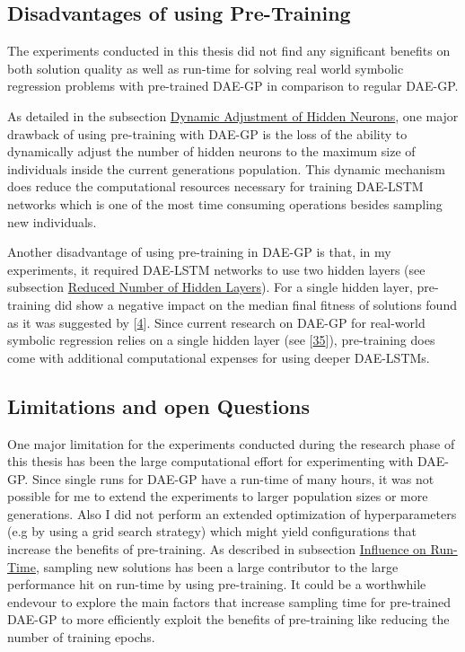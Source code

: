 \documentclass[
  11pt,
]{article}
\begin{document}
\hypertarget{disadvantages-of-using-pre-training}{%
\subsection{Disadvantages of using Pre-Training}\label{disadvantages-of-using-pre-training}}

The experiments conducted in this thesis did not find any significant benefits on both solution quality as well as run-time for solving real world symbolic regression problems with pre-trained DAE-GP in comparison to regular DAE-GP.

As detailed in the subsection \protect\hyperlink{dynamic-adjustment-of-hidden-neurons}{Dynamic Adjustment of Hidden Neurons}, one major drawback of using pre-training with DAE-GP is the loss of the ability to dynamically adjust the number of hidden neurons to the maximum size of individuals inside the current generations population.
This dynamic mechanism does reduce the computational resources necessary for training DAE-LSTM networks which is one of the most time consuming operations besides sampling new individuals.

Another disadvantage of using pre-training in DAE-GP is that, in my experiments, it required DAE-LSTM networks to use two hidden layers (see subsection \protect\hyperlink{reduced-number-of-hidden-layers}{Reduced Number of Hidden Layers}).
For a single hidden layer, pre-training did show a negative impact on the median final fitness of solutions found as it was suggested by {[}\protect\hyperlink{ref-pmlr-v9-erhan10a}{4}{]}.
Since current research on DAE-GP for real-world symbolic regression relies on a single hidden layer (see {[}\protect\hyperlink{ref-dae-gp_2022_symreg}{35}{]}), pre-training does come with additional computational expenses for using deeper DAE-LSTMs.

\hypertarget{limitations-and-open-questions}{%
\subsection{Limitations and open Questions}\label{limitations-and-open-questions}}

One major limitation for the experiments conducted during the research phase of this thesis has been the large computational effort for experimenting with DAE-GP.
Since single runs for DAE-GP have a run-time of many hours, it was not possible for me to extend the experiments to larger population sizes or more generations.
Also I did not perform an extended optimization of hyperparameters (e.g by using a grid search strategy) which might yield configurations that increase the benefits of pre-training.
As described in subsection \protect\hyperlink{influence-on-run-time}{Influence on Run-Time}, sampling new solutions has been a large contributor to the large performance hit on run-time by using pre-training.
It could be a worthwhile endevour to explore the main factors that increase sampling time for pre-trained DAE-GP to more efficiently exploit the benefits of pre-training like reducing the number of training epochs.
\end{document}
